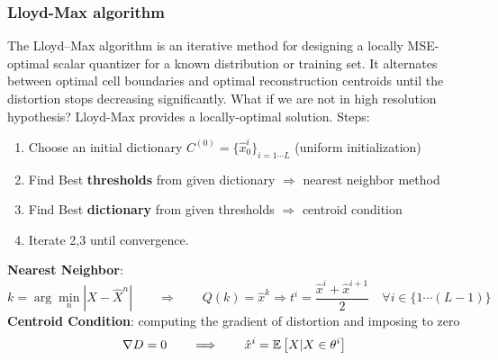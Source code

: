\subsubsection{Lloyd-Max algorithm}
The Lloyd--Max algorithm is an iterative method for designing a locally MSE-optimal scalar quantizer for a known distribution or training set. It alternates between optimal cell boundaries and optimal reconstruction centroids until the distortion stops decreasing significantly.
What if we are not in high resolution hypothesis? Lloyd-Max provides a locally-optimal solution. Steps:
\begin{enumerate}
    \item Choose an initial dictionary $C^{(0)} = \{\hat{x}^i_0\}_{i=1\cdots L}$ (uniform initialization)
    \item Find Best \textbf{thresholds} from given dictionary $\Rightarrow$ nearest neighbor method
    \item Find Best \textbf{dictionary} from given thresholds $\Rightarrow$ centroid condition
    \item Iterate 2,3 until convergence.
\end{enumerate}
\textbf{Nearest Neighbor}:
$$k = \arg\min_{n}|X - \hat{X}^n| \qquad \Longrightarrow \qquad Q(k) = \hat{x}^k \Rightarrow t^i = \frac{\hat{x}^i +\hat{x}^{i+1}}{2} \quad \forall i \in \{1\cdots(L-1)\}$$
\textbf{Centroid Condition}: computing the gradient of distortion and imposing to zero
$$\nabla D = 0 \qquad \Longrightarrow \qquad \hat{x}^i = \mathbb{E}\left[X| X \in \theta^i\right]$$
